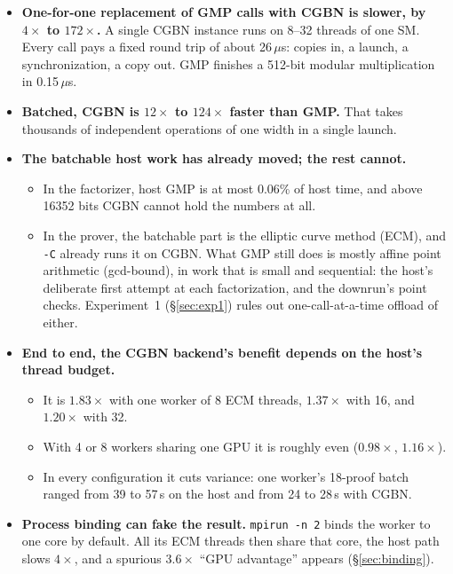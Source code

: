 \documentclass[11pt,a4paper]{article}
\newcommand{\code}[1]{\texttt{#1}}
\newcommand{\us}{\,$\mu$s}
\begin{document}
\begin{itemize}
  \item \textbf{One-for-one replacement of GMP calls with CGBN is slower,
    by $4\times$ to $172\times$.} A single CGBN instance runs on 8--32
    threads of one SM. Every call pays a fixed round trip of about
    26\us: copies in, a launch, a synchronization, a copy out. GMP
    finishes a 512-bit modular multiplication in 0.15\us.
  \item \textbf{Batched, CGBN is $12\times$ to $124\times$ faster than
    GMP.} That takes thousands of independent operations of one width in
    a single launch.
  \item \textbf{The batchable host work has already moved; the rest
    cannot.}
    \begin{itemize}
      \item In the factorizer, host GMP is at most 0.06\% of host time,
        and above 16352 bits CGBN cannot hold the numbers at all.
      \item In the prover, the batchable part is the elliptic curve method
        (ECM), and \code{-C} already runs it on CGBN. What GMP still does
        is mostly affine point arithmetic (gcd-bound), in work that is
        small and sequential: the host's deliberate first attempt at each
        factorization, and the downrun's point checks.
        Experiment~1 (\S\ref{sec:exp1}) rules out one-call-at-a-time
        offload of either.
    \end{itemize}
  \item \textbf{End to end, the CGBN backend's benefit depends on the
    host's thread budget.}
    \begin{itemize}
      \item It is $1.83\times$ with one worker of 8 ECM threads,
        $1.37\times$ with 16, and $1.20\times$ with 32.
      \item With 4 or 8 workers sharing one GPU it is roughly even
        ($0.98\times$, $1.16\times$).
      \item In every configuration it cuts variance: one worker's
        18-proof batch ranged from 39 to 57\,s on the host and from 24
        to 28\,s with CGBN.
    \end{itemize}
  \item \textbf{Process binding can fake the result.} \code{mpirun -n 2}
    binds the worker to one core by default. All its ECM threads then
    share that core, the host path slows $4\times$, and a spurious
    $3.6\times$ ``GPU advantage'' appears (\S\ref{sec:binding}).
\end{itemize}
\end{document}
